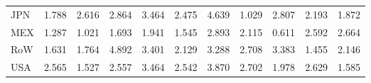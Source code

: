 \begin{table}[htbp]
\begin{tabular}{lcccccccccc}
  JPN & \textcolor[RGB]{201,130,54}{1.788} & \textcolor[RGB]{130,84,125}{2.616} & \textcolor[RGB]{102,66,153}{2.864} & \textcolor[RGB]{79,51,176}{3.464} & \textcolor[RGB]{145,94,110}{2.475} & \textcolor[RGB]{51,33,204}{4.639} & \textcolor[RGB]{242,157,13}{1.029} & \textcolor[RGB]{107,69,148}{2.807} & \textcolor[RGB]{163,106,92}{2.193} & \textcolor[RGB]{189,122,66}{1.872} \\ 
  MEX & \textcolor[RGB]{237,153,18}{1.287} & \textcolor[RGB]{245,158,10}{1.021} & \textcolor[RGB]{207,134,48}{1.693} & \textcolor[RGB]{184,119,71}{1.941} & \textcolor[RGB]{219,142,36}{1.545} & \textcolor[RGB]{99,64,156}{2.893} & \textcolor[RGB]{173,112,82}{2.115} & \textcolor[RGB]{252,163,3}{0.611} & \textcolor[RGB]{133,86,122}{2.592} & \textcolor[RGB]{120,78,135}{2.664} \\ 
  RoW & \textcolor[RGB]{212,137,43}{1.631} & \textcolor[RGB]{204,132,51}{1.764} & \textcolor[RGB]{46,30,209}{4.892} & \textcolor[RGB]{84,54,171}{3.401} & \textcolor[RGB]{171,111,84}{2.129} & \textcolor[RGB]{92,59,163}{3.288} & \textcolor[RGB]{115,74,140}{2.708} & \textcolor[RGB]{87,56,168}{3.383} & \textcolor[RGB]{227,147,28}{1.455} & \textcolor[RGB]{168,109,87}{2.146} \\ 
  USA & \textcolor[RGB]{135,87,120}{2.565} & \textcolor[RGB]{224,145,31}{1.527} & \textcolor[RGB]{138,89,117}{2.557} & \textcolor[RGB]{82,53,173}{3.464} & \textcolor[RGB]{140,91,115}{2.542} & \textcolor[RGB]{64,41,191}{3.870} & \textcolor[RGB]{117,76,138}{2.702} & \textcolor[RGB]{178,115,76}{1.978} & \textcolor[RGB]{128,82,128}{2.629} & \textcolor[RGB]{217,140,38}{1.585} \\ 
   \hline
\end{tabular}
\end{table}
